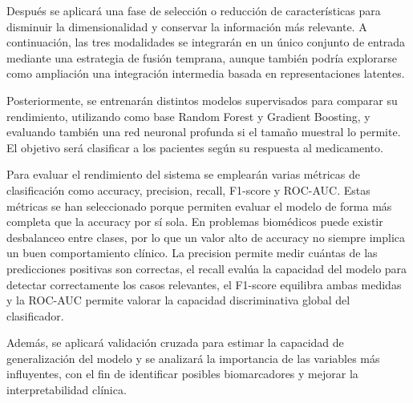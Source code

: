 \documentclass[11pt]{article}
\begin{document}
Después se aplicará una fase de selección o reducción de características para disminuir la dimensionalidad y conservar la información más relevante. A continuación, las tres modalidades se integrarán en un único conjunto de entrada mediante una estrategia de fusión temprana, aunque también podría explorarse como ampliación una integración intermedia basada en representaciones latentes.

Posteriormente, se entrenarán distintos modelos supervisados para comparar su rendimiento, utilizando como base Random Forest y Gradient Boosting, y evaluando también una red neuronal profunda si el tamaño muestral lo permite. El objetivo será clasificar a los pacientes según su respuesta al medicamento.

Para evaluar el rendimiento del sistema se emplearán varias métricas de clasificación como accuracy, precision, recall, F1-score y ROC-AUC. Estas métricas se han seleccionado porque permiten evaluar el modelo de forma más completa que la accuracy por sí sola. En problemas biomédicos puede existir desbalanceo entre clases, por lo que un valor alto de accuracy no siempre implica un buen comportamiento clínico. La precision permite medir cuántas de las predicciones positivas son correctas, el recall evalúa la capacidad del modelo para detectar correctamente los casos relevantes, el F1-score equilibra ambas medidas y la ROC-AUC permite valorar la capacidad discriminativa global del clasificador.

Además, se aplicará validación cruzada para estimar la capacidad de generalización del modelo y se analizará la importancia de las variables más influyentes, con el fin de identificar posibles biomarcadores y mejorar la interpretabilidad clínica.
\end{document}
